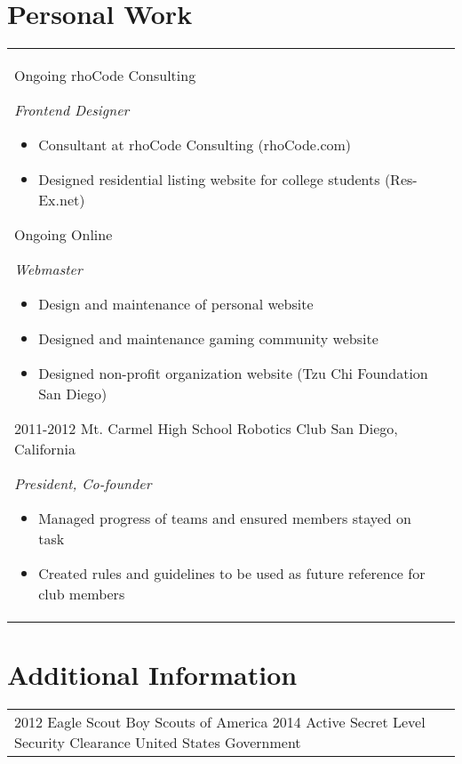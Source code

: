 \documentclass[print]{friggeri-cv} %
\makeatletter
\renewenvironment{entrylist}{%
	\par\begin{tabular*}{\textwidth}{@{\extracolsep{\fill}}ll}
	}{%
\end{tabular*}\par
}
\makeatother
\begin{document}
\section{Personal Work}

\begin{entrylist}
\entry
{Ongoing}
{rhoCode Consulting}
{ }
{\emph{Frontend Designer}
\begin{itemize}
\item Consultant at rhoCode Consulting (rhoCode.com)
\item Designed residential listing website for college students (Res-Ex.net)
\end{itemize}}
\entry
{Ongoing}
{Online}
{ }
{\emph{Webmaster}
\begin{itemize}
\item Design and maintenance of personal website
\item Designed and maintenance gaming community website
\item Designed non-profit organization website (Tzu Chi Foundation San Diego)
\end{itemize}}
\entry
{2011-2012}
{Mt. Carmel High School Robotics Club}
{San Diego, California}
{\emph{President, Co-founder}
\begin{itemize}
\item Managed progress of teams and ensured members stayed on task
\item Created rules and guidelines to be used as future reference for club members
\end{itemize}}

\end{entrylist}


\section{Additional Information}

\begin{entrylist}
\entry
{2012}
{Eagle Scout}
{Boy Scouts of America}
{}
\entry
{2014}
{Active Secret Level Security Clearance}
{United States Government}
{}
\end{entrylist}


\end{document}
